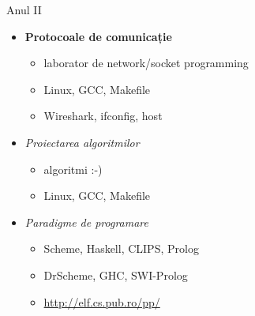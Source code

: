 \documentclass{beamer}
\begin{document}

\begin{frame}{Anul II}
	\begin{itemize}
		\item \textbf{Protocoale de comunicație}
			\begin{itemize}
				\item laborator de network/socket programming
				\item Linux, GCC, Makefile
				\item Wireshark, ifconfig, host
			\end{itemize}
		\item \textit{Proiectarea algoritmilor}
			\begin{itemize}
				\item algoritmi :-)
				\item Linux, GCC, Makefile
			\end{itemize}
		\item \textit{Paradigme de programare}
			\begin{itemize}
				\item Scheme, Haskell, CLIPS, Prolog
				\item DrScheme, GHC, SWI-Prolog
				\item \url{http://elf.cs.pub.ro/pp/}
			\end{itemize}
	\end{itemize}
\end{frame}

\end{document}
